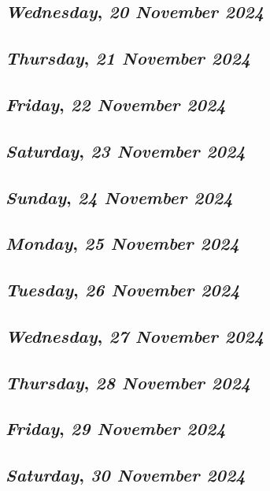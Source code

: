 \def\day{\textit{20 November 2024}}
\def\weekday{\textit{Wednesday}}
\subsection*{\weekday, \day}

\def\day{\textit{21 November 2024}}
\def\weekday{\textit{Thursday}}
\subsection*{\weekday, \day}

\def\day{\textit{22 November 2024}}
\def\weekday{\textit{Friday}}
\subsection*{\weekday, \day}

\def\day{\textit{23 November 2024}}
\def\weekday{\textit{Saturday}}
\subsection*{\weekday, \day}

\def\day{\textit{24 November 2024}}
\def\weekday{\textit{Sunday}}
\subsection*{\weekday, \day}

\def\day{\textit{25 November 2024}}
\def\weekday{\textit{Monday}}
\subsection*{\weekday, \day}

\def\day{\textit{26 November 2024}}
\def\weekday{\textit{Tuesday}}
\subsection*{\weekday, \day}

\def\day{\textit{27 November 2024}}
\def\weekday{\textit{Wednesday}}
\subsection*{\weekday, \day}

\def\day{\textit{28 November 2024}}
\def\weekday{\textit{Thursday}}
\subsection*{\weekday, \day}

\def\day{\textit{29 November 2024}}
\def\weekday{\textit{Friday}}
\subsection*{\weekday, \day}

\def\day{\textit{30 November 2024}}
\def\weekday{\textit{Saturday}}
\subsection*{\weekday, \day}
